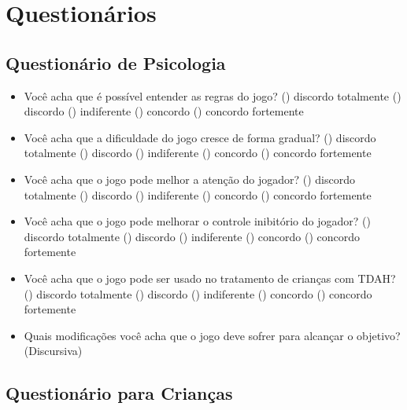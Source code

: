 \chapter{Question\'arios}
\label{ap:measurement-instruments}


\section{Question\'ario de Psicologia}
\label{ap:sec:psi}


\begin{itemize}
	\item Voc\^e acha que \'e poss\'{i}vel entender as regras do jogo?
	\subitem () discordo totalmente
	\subitem () discordo
	\subitem () indiferente
	\subitem () concordo 
	\subitem () concordo fortemente
	\item Voc\^e acha que a dificuldade do jogo cresce de forma gradual? 
	\subitem () discordo totalmente
	\subitem () discordo
	\subitem () indiferente
	\subitem () concordo 
	\subitem () concordo fortemente
	\item Voc\^e acha que o jogo pode melhor a aten\c{c}\~{a}o do jogador?
	\subitem () discordo totalmente
	\subitem () discordo
	\subitem () indiferente
	\subitem () concordo 
	\subitem () concordo fortemente
	\item Voc\^e acha que o jogo pode melhorar o controle inibit\'orio do jogador?
	\subitem () discordo totalmente
	\subitem () discordo
	\subitem () indiferente
	\subitem () concordo 
	\subitem () concordo fortemente
	\item Voc\^e acha que o jogo pode ser usado no tratamento de crian\c{c}as com TDAH?
	\subitem () discordo totalmente
	\subitem () discordo
	\subitem () indiferente
	\subitem () concordo 
	\subitem () concordo fortemente
	\item Quais modifica\c{c}\~oes voc\^e acha que o jogo deve sofrer para alcan\c{c}ar o objetivo?
	(Discursiva)
	
\end{itemize}



\section{Question\'ario para Crian\c{c}as}
\label{ap:sec:cri}



